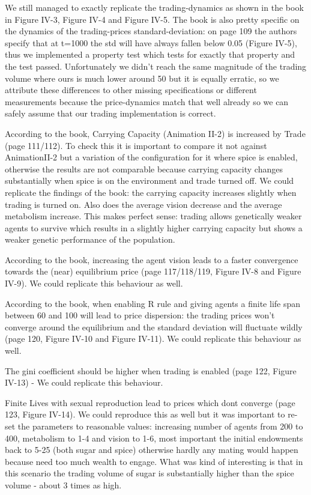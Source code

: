 We still managed to exactly replicate the trading-dynamics as shown in the book in Figure IV-3, Figure IV-4 and Figure IV-5. The book is also pretty specific on the dynamics of the trading-prices standard-deviation: on page 109 the authors specify that at t=1000 the std will have always fallen below 0.05 (Figure IV-5), thus we implemented a property test which tests for exactly that property and the test passed. Unfortunately we didn't reach the same magnitude of the trading volume where ours is much lower around 50 but it is equally erratic, so we attribute these differences to other missing specifications or different measurements because the price-dynamics match that well already so we can safely assume that our trading implementation is correct.

According to the book, Carrying Capacity (Animation II-2) is increased by Trade (page 111/112). To check this it is important to compare it not against AnimationII-2 but a variation of the configuration for it where spice is enabled, otherwise the results are not comparable because carrying capacity changes substantially when spice is on the environment and trade turned off. We could replicate the findings of the book: the carrying capacity increases slightly when trading is turned on. Also does the average vision decrease and the average metabolism increase. This makes perfect sense: trading allows genetically weaker agents to survive which results in a slightly higher carrying capacity but shows a weaker genetic performance of the population.

According to the book, increasing the agent vision leads to a faster convergence towards the (near) equilibrium price (page 117/118/119, Figure IV-8 and Figure IV-9). We could replicate this behaviour as well.

According to the book, when enabling R rule and giving agents a finite life span between 60 and 100 will lead to price dispersion: the trading prices won't converge around the equilibrium and the standard deviation will fluctuate wildly (page 120, Figure IV-10 and Figure IV-11). We could replicate this behaviour as well.

The gini coefficient should be higher when trading is enabled (page 122, Figure IV-13) - We could replicate this behaviour.

Finite Lives with sexual reproduction lead to prices which dont converge (page 123, Figure IV-14). We could reproduce this as well but it was important to re-set the parameters to reasonable values: increasing number of agents from 200 to 400, metabolism to 1-4 and vision to 1-6, most important the initial endowments back to 5-25 (both sugar and spice) otherwise hardly any mating would happen because need too much wealth to engage. What was kind of interesting is that in this scenario the trading volume of sugar is substantially higher than the spice volume - about 3 times as high. 

